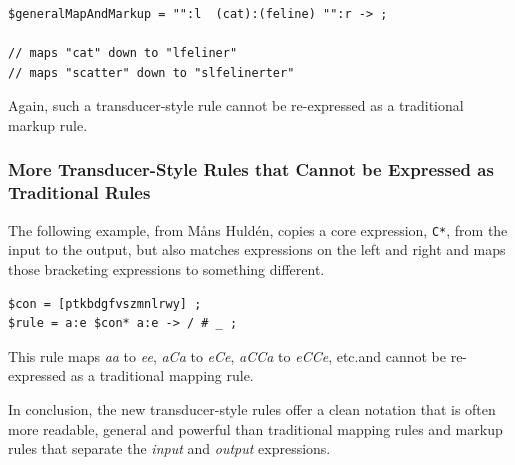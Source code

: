 \begin{Verbatim}
$generalMapAndMarkup = "":l  (cat):(feline) "":r -> ;

// maps "cat" down to "lfeliner"
// maps "scatter" down to "slfelinerter"
\end{Verbatim}

\noindent
Again, such a transducer-style rule cannot be re-expressed as a traditional markup rule.

\subsubsection{More Transducer-Style Rules that Cannot be Expressed as
Traditional Rules}

The following example, from M\r{a}ns Huldén, copies a core expression, \verb!C*!, from the
input to the output, but also matches expressions on the left and right and maps those
bracketing expressions to something different.

\begin{Verbatim}
$con = [ptkbdgfvszmnlrwy] ;
$rule = a:e $con* a:e -> / # _ ;
\end{Verbatim}

\noindent
This rule maps \emph{aa} to \emph{ee}, \emph{aCa} to \emph{eCe}, \emph{aCCa}
to \emph{eCCe}, etc.\@ and cannot be re-expressed as a traditional mapping rule.

In conclusion, the new transducer-style rules offer a clean notation that is often more
readable, general and powerful than traditional mapping rules and markup
rules that separate the \emph{input}
and \emph{output} expressions.  
